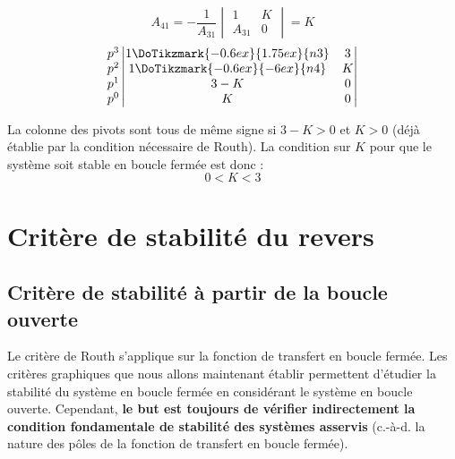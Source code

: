 \[
A_{41}=-\dfrac{1}{A_{31}}\begin{vmatrix} 1 & K \\ A_{31} & 0 \end{vmatrix}=K
\]
\[
\begin{matrix}
    p^3 \\
    p^2 \\
    p^1 \\
    p^0 \\
\end{matrix}
\begin{vmatrix}
    1\DoTikzmark{-0.6ex}{1.75ex}{n3}   & 3  \\
    1\DoTikzmark{-0.6ex}{-6ex}{n4}     & K  \\
    3-K                      & 0  \\
    K                        & 0    
    \end{vmatrix}
\]

La colonne des pivots sont tous de même signe si $3-K>0$ et $K>0$ (déjà établie 
par la condition nécessaire de Routh). La condition sur $K$ pour que le 
système soit stable en boucle fermée est donc :
\[
    0<K<3
\]
\section{Critère de stabilité du revers}
\subsection{Critère de stabilité à partir de la boucle ouverte}
Le critère de Routh s'applique sur la fonction de transfert en boucle fermée.
Les critères graphiques que nous allons maintenant établir 
permettent d'étudier la stabilité du système en boucle fermée en considérant 
le système en boucle ouverte. Cependant, \textbf{le but est toujours de vérifier
indirectement la condition fondamentale de stabilité des systèmes asservis}
(c.-à-d. la nature des pôles de la fonction de transfert en boucle fermée).


